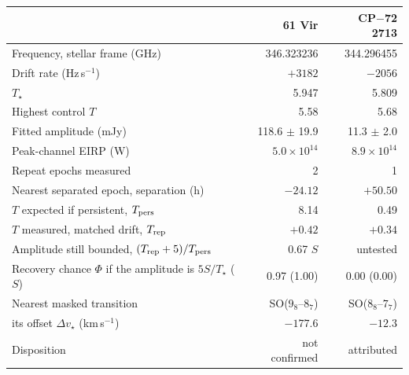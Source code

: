 \begin{tabular}{@{}>{\raggedright\arraybackslash}p{}@{~~}r@{~~}r@{}}
\hline
 & 61 Vir & CP$-$72 2713 \\
\hline
Frequency, stellar frame (GHz) & 346.323236 & 344.296455 \\
Drift rate (Hz\,s$^{-1}$) & $+3182$ & $-2056$ \\
$T_\star$ & 5.947 & 5.809 \\
Highest control $T$ & 5.58 & 5.68 \\
Fitted amplitude (mJy) & 118.6 $\pm$ 19.9 & 11.3 $\pm$ 2.0 \\
Peak-channel EIRP (W) & $5.0 \times 10^{14}$ & $8.9 \times 10^{14}$ \\
Repeat epochs measured & 2 & 1 \\
Nearest separated epoch, separation (h) & $-24.12$ & $+50.50$ \\
$T$ expected if persistent, $T_{\rm pers}$ & 8.14 & 0.49 \\
$T$ measured, matched drift, $T_{\rm rep}$ & $+0.42$ & $+0.34$ \\
Amplitude still bounded, $(T_{\rm rep}+5)/T_{\rm pers}$ & 0.67 $S$ & untested \\
Recovery chance $\Phi$ if the amplitude is $5S/T_\star$ ($S$) & 0.97 (1.00) & 0.00 (0.00) \\
Nearest masked transition & SO($9_{8}$--$8_{7}$) & SO($8_{8}$--$7_{7}$) \\
\quad its offset $\Delta v_\star$ (km\,s$^{-1}$) & $-177.6$ & $-12.3$ \\
Disposition & not confirmed & attributed \\
\hline
\end{tabular}
